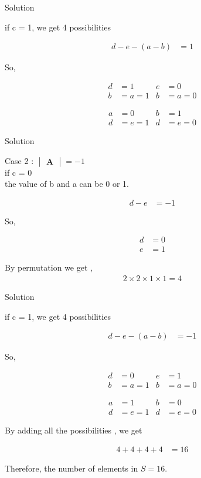 \documentclass{beamer}
\numberwithin{equation}{section}
\theoremstyle{remark}
\newcommand{\mydet}[1]{\ensuremath{\begin{vmatrix}#1\end{vmatrix}}}
\let\vec\mathbf
\begin{document}
\begin{frame}{Solution}

if c = 1, we get 4 possibilities

\begin{align}
d - e -(a - b) &= 1
\end{align}

So,

\begin{align}
  d &= 1 & e&=0 \\   
  b&=a=1 & b&=a=0
\end{align}

\begin{align}
  a &= 0 & b&=1 \\   
  d&=e=1 & d&=e=0
\end{align}

\end{frame}

\begin{frame}{Solution}

Case 2 : $\mydet{\vec{A}}= -1$ \\

if c = 0 \\
the value of b and a can be 0 or 1.

\begin{align}
d - e &= -1
\end{align}

So,

\begin{align}
d &= 0 \\  
e &= 1
\end{align}

By permutation we get ,\\

\begin{align}
2 \times 2 \times 1 \times 1 = 4
\end{align}

\end{frame}

\begin{frame}{Solution}

if c = 1, we get 4 possibilities

\begin{align}
d - e -(a - b) &= -1
\end{align}

So,

\begin{align}
  d &= 0 & e&=1 \\   
  b&=a=1 & b&=a=0
\end{align}

\begin{align}
  a &= 1 & b&=0 \\   
  d&=e=1 & d&=e=0
\end{align}

By adding all the possibilities , we get 

\begin{align}
  4 + 4 + 4 + 4 &= 16
\end{align}

Therefore, the number of elements in \(S=16\).

\end{frame}
\end{document}
